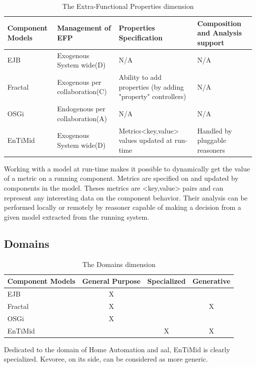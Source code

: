 \begin{table}[h!]
\centering
{\scriptsize
\begin{tabular}{|>{\centering}m{}||>{\centering}m{}|>{\centering}m{}|>{\centering\arraybackslash}m{}|}
\hline
Component Models & Management of EFP & Properties Specification & Composition and Analysis support \\
\hline
EJB & Exogenous System wide(D) & N/A & N/A \\
\hline
Fractal & Exogenous per collaboration(C) & Ability to add properties (by adding "property" controllers) & N/A \\
\hline
OSGi & Endogenous per collaboration(A) & N/A & N/A \\
\hline\hline
EnTiMid & Exogenous System wide(D) & Metrics<key,value> values updated at run-time & Handled by pluggable reasoners \\
\hline
\end{tabular}
}
\caption{The Extra-Functional Properties dimension}
\label{table:classifProp}
\end{table}

Working with a model at run-time makes it possible to dynamically get the value of a metric on a running component. Metrics are specified on and updated by components in the model. Theses metrics are <key,value> pairs and can represent any interesting data on the component behavior. Their analysis can be performed locally or remotely by reasoner capable of making a decision from a given model extracted from the running system.

\subsection{Domains}

\begin{table}[h!]
\centering
{\scriptsize
\begin{tabular}{|>{\centering}m{}||c|c|c|}
\hline
Component Models & General Purpose & Specialized & Generative \\
\hline
EJB & X & & \\
\hline
Fractal & X & & X \\
\hline
OSGi & X & & \\
\hline\hline
EnTiMid & & X & X \\
\hline
\end{tabular}
}
\caption{The Domains dimension}
\label{table:classifDomains}
\end{table}

Dedicated to the domain of Home Automation and \gls{aal}, EnTiMid is clearly specialized. Kevoree, on its side, can be considered as more generic.
